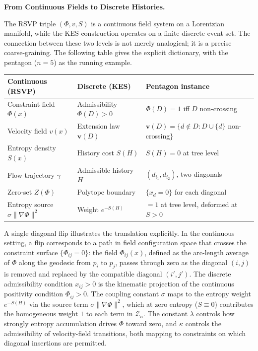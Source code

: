 \documentclass[11pt]{article}
\theoremstyle{plain}
\theoremstyle{definition}
\theoremstyle{remark}
\newcommand{\Phif}{\Phi}
\newcommand{\vf}{v}
\newcommand{\Sf}{S}
\begin{document}
\bigskip\noindent\textbf{From Continuous Fields to Discrete Histories.}
\label{sec:bridge}

The RSVP triple $(\Phif, \vf, \Sf)$ is a continuous field system on a Lorentzian manifold, while the KES construction operates on a finite discrete event set. The connection between these two levels is not merely analogical; it is a precise coarse-graining. The following table gives the explicit dictionary, with the pentagon ($n=5$) as the running example.

\begin{center}
\begin{tabular}{lll}
\toprule
Continuous (RSVP) & Discrete (KES) & Pentagon instance \\
\midrule
Constraint field $\Phif(x)$ & Admissibility $\Phif(D) > 0$ & $\Phif(D)=1$ iff $D$ non-crossing \\
Velocity field $\vf(x)$ & Extension law $\mathbf{v}(D)$ & $\mathbf{v}(D) = \{d \notin D : D \cup \{d\}$ non-crossing$\}$ \\
Entropy density $\Sf(x)$ & History cost $\Sf(H)$ & $\Sf(H) = 0$ at tree level \\
Flow trajectory $\gamma$ & Admissible history $H$ & $(d_{i_1}, d_{i_2})$, two diagonals \\
Zero-set $Z(\Phif)$ & Polytope boundary & $\{x_d = 0\}$ for each diagonal \\
Entropy source $\sigma\|\nabla\Phif\|^2$ & Weight $e^{-\Sf(H)}$ & $=1$ at tree level, deformed at $\Sf > 0$ \\
\bottomrule
\end{tabular}
\end{center}

A single diagonal flip illustrates the translation explicitly. In the continuous setting, a flip corresponds to a path in field configuration space that crosses the constraint surface $\{\Phif_{ij} = 0\}$: the field $\Phif_{ij}(x)$, defined as the arc-length average of $\Phif$ along the geodesic from $p_i$ to $p_j$, passes through zero as the diagonal $(i,j)$ is removed and replaced by the compatible diagonal $(i', j')$. The discrete admissibility condition $x_{ij} > 0$ is the kinematic projection of the continuous positivity condition $\Phif_{ij} > 0$. The coupling constant $\sigma$ maps to the entropy weight $e^{-\Sf(H)}$ via the source term $\sigma\|\nabla\Phif\|^2$, which at zero entropy ($\Sf \equiv 0$) contributes the homogeneous weight $1$ to each term in $\mathcal{Z}_n$. The constant $\lambda$ controls how strongly entropy accumulation drives $\Phif$ toward zero, and $\kappa$ controls the admissibility of velocity-field transitions, both mapping to constraints on which diagonal insertions are permitted.
\end{document}
